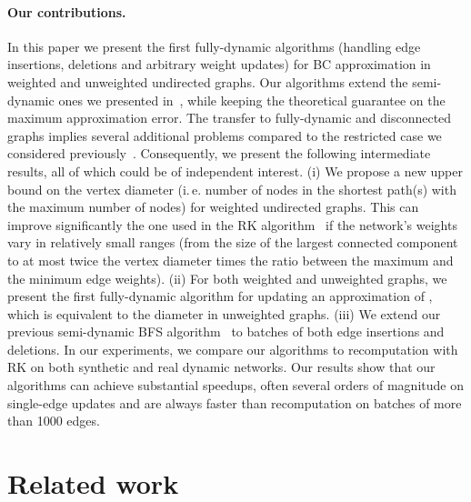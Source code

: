 \documentclass[english]{llncs}
\newcommand{\ie}{i.\,e.\xspace}
\newcommand{\vd}{\xspace}
\newcommand{\rk}{\textsf{RK}\xspace}
\begin{document}
\paragraph{Our contributions.}
In this paper we present the first fully-dynamic algorithms (handling edge insertions, deletions and arbitrary weight updates) for BC approximation in weighted and unweighted undirected graphs. Our algorithms extend the semi-dynamic ones we presented in~\cite{DBLP:conf/alenex/BergaminiMS15}, while keeping the theoretical guarantee on the maximum approximation error.
The transfer to fully-dynamic and disconnected graphs implies several additional problems compared to the restricted case we considered previously~\cite{DBLP:conf/alenex/BergaminiMS15}.
Consequently, we present the following intermediate results, all of which could be of independent interest.
(i) We propose a new upper bound on the vertex diameter \vd (\ie number of nodes in the shortest path(s) with the maximum number of nodes) for weighted undirected graphs. This can improve significantly the one used in the \rk algorithm~\cite{DBLP:conf/wsdm/RiondatoK14} if the network's weights vary in relatively small ranges (from the size of the largest connected component to at most twice the vertex diameter times the ratio between the maximum and the minimum edge weights).
(ii) For both weighted and unweighted graphs, we present the first fully-dynamic algorithm for updating an approximation of \vd, which is equivalent to the diameter in unweighted graphs.
(iii) We extend our previous semi-dynamic BFS algorithm~\cite{DBLP:conf/alenex/BergaminiMS15} to batches of both edge insertions and deletions.
In our experiments, we compare our algorithms to recomputation with \rk on both synthetic and real dynamic networks. Our results show that our algorithms can achieve substantial speedups, often several orders of magnitude on single-edge updates and are always faster than recomputation on batches of more than 1000 edges. 
\section{Related work}
\label{sec:related_work}
\end{document}

